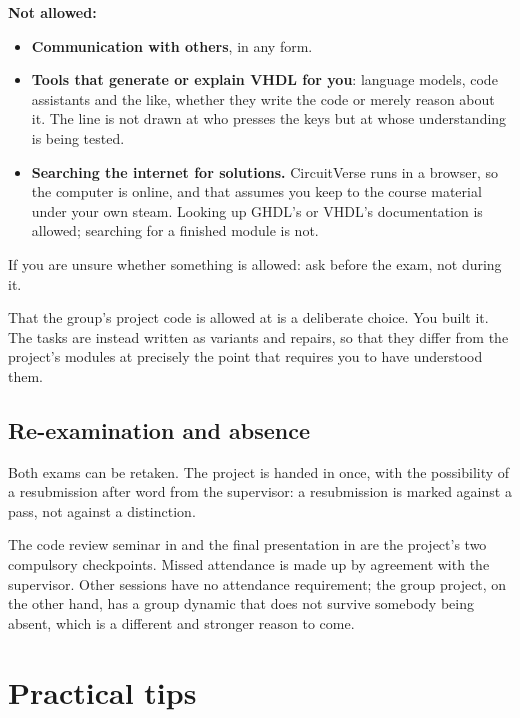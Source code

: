 \textbf{Not allowed:}
\begin{itemize}
  \item \textbf{Communication with others}, in any form.
  \item \textbf{Tools that generate or explain VHDL for you}: language models, code assistants and
    the like, whether they write the code or merely reason about it. The line is not drawn at who
    presses the keys but at whose understanding is being tested.
  \item \textbf{Searching the internet for solutions.} CircuitVerse runs in a browser, so the computer
    is online, and that assumes you keep to the course material under your own steam. Looking up
    GHDL's or VHDL's documentation is allowed; searching for a finished module is not.
\end{itemize}

If you are unsure whether something is allowed: ask before the exam, not during it.

That the group's project code is allowed at  is a deliberate choice. You built it. The
tasks are instead written as variants and repairs, so that they differ from the project's modules at
precisely the point that requires you to have understood them.

\subsection{Re-examination and absence}
\label{app:project:reexam}

Both exams can be retaken. The project is handed in once, with the possibility of a resubmission
after word from the supervisor: a resubmission is marked against a pass, not against a distinction.

The code review seminar in  and the final presentation in  are the
project's two compulsory checkpoints. Missed attendance is made up by agreement with the supervisor.
Other sessions have no attendance requirement; the group project, on the other hand, has a group
dynamic that does not survive somebody being absent, which is a different and stronger reason to come.

\section{Practical tips}
\label{app:project:tips}

